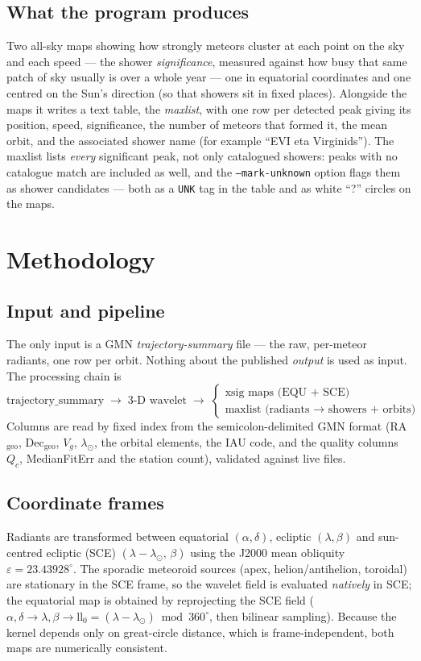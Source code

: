 \documentclass[11pt]{article}
\newcommand{\flag}[1]{\texttt{#1}}
\begin{document}
\subsection{What the program produces}
Two all-sky maps showing how strongly meteors cluster at each point on the sky and
each speed --- the shower \emph{significance}, measured against how busy that same
patch of sky usually is over a whole year --- one in equatorial coordinates and
one centred on the Sun's direction (so that showers sit in fixed places).
Alongside the maps it writes a text table, the \emph{maxlist}, with one row per
detected peak giving its position, speed, significance, the number of meteors
that formed it, the mean orbit, and the associated shower name (for example
``EVI eta Virginids''). The maxlist lists \emph{every} significant peak, not only
catalogued showers: peaks with no catalogue match are included as well, and the
\flag{--mark-unknown} option flags them as shower candidates --- both as a
\texttt{UNK} tag in the table and as white ``?'' circles on the maps.

\section{Methodology}
\label{sec:method}

\subsection{Input and pipeline}
The only input is a GMN \emph{trajectory-summary} file --- the raw, per-meteor
radiants, one row per orbit. Nothing about the published \emph{output} is used as
input. The processing chain is
\[
\text{trajectory\_summary} \;\longrightarrow\; \text{3-D wavelet}
\;\longrightarrow\;
\begin{cases}
\text{xsig maps (EQU + SCE)}\\
\text{maxlist (radiants $\to$ showers + orbits)}
\end{cases}
\]
Columns are read by fixed index from the semicolon-delimited GMN format
(RA${}_\mathrm{geo}$, Dec${}_\mathrm{geo}$, $V_g$, $\lambda_\odot$, the orbital
elements, the IAU code, and the quality columns $Q_c$, MedianFitErr and the
station count), validated against live files.

\subsection{Coordinate frames}
Radiants are transformed between equatorial $(\alpha,\delta)$, ecliptic
$(\lambda,\beta)$ and sun-centred ecliptic (SCE) $(\lambda - \lambda_\odot,\,
\beta)$ using the J2000 mean obliquity $\varepsilon = 23.43928^\circ$. The
sporadic meteoroid sources (apex, helion/antihelion, toroidal) are stationary in
the SCE frame, so the wavelet field is evaluated \emph{natively} in SCE; the
equatorial map is obtained by reprojecting the SCE field
($\alpha,\delta \to \lambda,\beta \to \mathrm{ll}_0 = (\lambda-\lambda_\odot)
\bmod 360^\circ$, then bilinear sampling). Because the kernel depends only on
great-circle distance, which is frame-independent, both maps are numerically
consistent.
\end{document}
